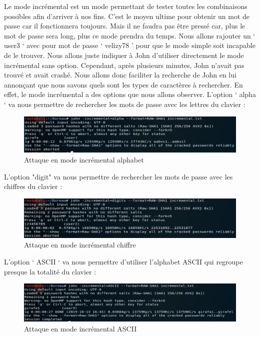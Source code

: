 Le mode incrémental est un mode permettant de tester toutes les combinaisons possibles afin d'arriver à nos fins. C’est le moyen ultime pour obtenir un mot de passe car il fonctionnera toujours. Mais il ne faudra pas être pressé car, plus le mot de passe sera long, plus ce mode prendra du temps.
Nous allons rajouter un ‘ user3 ‘ avec pour mot de passe ‘ velizy78 ’ pour que le mode simple soit incapable de le trouver. Nous allons juste indiquer à John d’utiliser directement le mode incrémental sans option.
Cependant, après plusieurs minutes, John n’avait pas trouvé et avait crashé.
Nous allons donc faciliter la recherche de John en lui annonçant que nous savons quels sont les types de caractères à rechercher. En effet, le mode incrémental a des options que nous allons observer.
L’option ‘ alpha ‘ va nous permettre de rechercher les mots de passe avec les lettres du clavier :

\begin{figure}[htp!]
  \centering
  \setlength\figureheight{7cm}
  \setlength\figurewidth{9cm}
  \includegraphics[width=1\textwidth]{oui/Ancien/imangeancien/john/incremental_alpha.PNG}
  \caption{Attaque en mode incrémental alphabet}
  \label{fig:courbe-tikz}
\end{figure}

L’option "digit" va nous permettre de rechercher les mots de passe avec les chiffres du clavier :

\begin{figure}[htp!]
  \centering
  \setlength\figureheight{7cm}
  \setlength\figurewidth{9cm}
  \includegraphics[width=1\textwidth]{oui/Ancien/imangeancien/john/incremental_digits.PNG}
  \caption{Attaque en mode incrémental chiffre}
  \label{fig:courbe-tikz}
\end{figure}

L’option ‘ ASCII ‘ va nous permettre d’utiliser l'alphabet ASCII qui regroupe presque la totalité du clavier :

\begin{figure}[htp!]
  \centering
  \setlength\figureheight{7cm}
  \setlength\figurewidth{9cm}
  \includegraphics[width=1\textwidth]{oui/Ancien/imangeancien/john/incremental_ASCII.PNG}
  \caption{Attaque en mode incrémental ASCII}
  \label{fig:courbe-tikz}
\end{figure}

